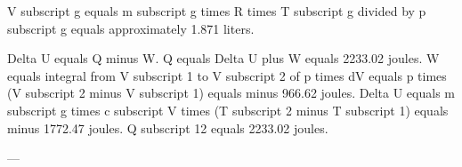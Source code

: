 V subscript g equals m subscript g times R times T subscript g divided by p subscript g equals approximately 1.871 liters.  

Delta U equals Q minus W.  
Q equals Delta U plus W equals 2233.02 joules.  
W equals integral from V subscript 1 to V subscript 2 of p times dV equals p times (V subscript 2 minus V subscript 1) equals minus 966.62 joules.  
Delta U equals m subscript g times c subscript V times (T subscript 2 minus T subscript 1) equals minus 1772.47 joules.  
Q subscript 12 equals 2233.02 joules.  

---
